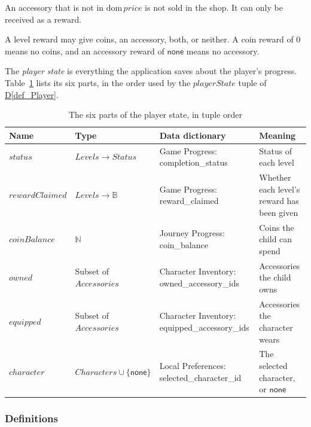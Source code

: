 \documentclass[12pt]{article}
\newcommand{\defref}[1]{\hyperref[#1]{D\ref*{#1}}}
\newcommand{\val}[1]{\ensuremath{\mathsf{#1}}}
\begin{document}
An accessory that is not in $\mathrm{dom}\,\mathit{price}$ is not sold in the
shop. It can only be received as a reward.

A level reward may give coins, an accessory, both, or neither. A coin reward of
$0$ means no coins, and an accessory reward of \val{none} means no accessory.

The \emph{player state} is everything the application saves about the player's
progress. Table~\ref{tab:ModelState} lists its six parts, in the order used by
the $\mathit{playerState}$ tuple of \defref{def_Player}.

\begin{table}[H]
\centering
\caption{The six parts of the player state, in tuple order}
\label{tab:ModelState}
\small
\begin{tabular}{>{\raggedright\arraybackslash}p{}>{\raggedright\arraybackslash}p{}>{\raggedright\arraybackslash}p{}>{\raggedright\arraybackslash}p{}}
\toprule
\textbf{Name} & \textbf{Type} & \textbf{Data dictionary} & \textbf{Meaning}\\
\midrule
$\mathit{status}$ & $\mathit{Levels} \to \mathit{Status}$ &
  Game Progress: completion\_status & Status of each level\\[3pt]
$\mathit{rewardClaimed}$ & $\mathit{Levels} \to \mathbb{B}$ &
  Game Progress: reward\_claimed & Whether each level's reward has been
  given\\[3pt]
$\mathit{coinBalance}$ & $\mathbb{N}$ & Journey Progress: coin\_balance & Coins
  the child can spend\\[3pt]
$\mathit{owned}$ & Subset of $\mathit{Accessories}$ & Character Inventory:
  owned\_\allowbreak accessory\_\allowbreak ids & Accessories the child
  owns\\[3pt]
$\mathit{equipped}$ & Subset of $\mathit{Accessories}$ & Character Inventory:
  equipped\_\allowbreak accessory\_\allowbreak ids & Accessories the character
  wears\\[3pt]
$\mathit{character}$ & $\mathit{Characters} \cup \{\val{none}\}$ &
  Local Preferences: selected\_\allowbreak character\_\allowbreak id & The
  selected character, or \val{none}\\
\bottomrule
\end{tabular}
\end{table}

\subsubsection{Definitions}
\label{sec_FormalJourney}
\end{document}
